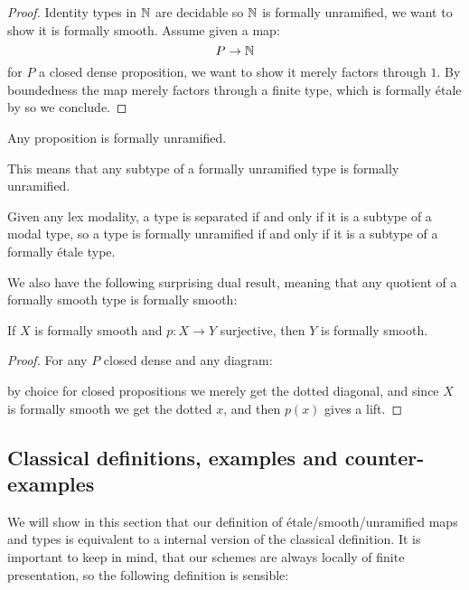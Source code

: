 \begin{proof}
Identity types in $\mathbb{N}$ are decidable so $\mathbb{N}$ is formally unramified, we want to show it is formally smooth. Assume given a map:
\[P\to \mathbb{N}\]
for $P$ a closed dense proposition, we want to show it merely factors through $1$. By boundedness the map merely factors through a finite type, which is formally étale by  so we conclude.
\end{proof}

\begin{lemma}\label{prop-are-unramified}
Any proposition is formally unramified.
\end{lemma}

This means that any subtype of a formally unramified type is formally unramified.

\begin{remark}
  Given any lex modality, a type is separated if and only if it is a subtype of a modal type,
  so a type is formally unramified if and only if it is a subtype of a formally étale type.
\end{remark}

We also have the following surprising dual result, meaning that any quotient of a formally smooth type is formally smooth:

\begin{proposition}\label{smoothSurjective}
If $X$ is formally smooth and $p:X\to Y$ surjective, then $Y$ is formally smooth.
\end{proposition}

\begin{proof}
For any $P$ closed dense and any diagram:
 \begin{center}
    \end{center} 
    by choice for closed propositions we merely get the dotted diagonal, and since $X$ is formally smooth we get the dotted $x$, and then $p(x)$ gives a lift.
\end{proof}


\subsection{Classical definitions, examples and counter-examples}

We will show in this section that our definition of étale/smooth/unramified maps and types is equivalent to a internal version of the classical definition. It is important to keep in mind, that our schemes are always locally of finite presentation, so the following definition is sensible:

